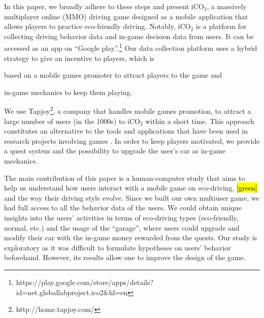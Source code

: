 \documentclass[preprint,authoryear,12pt]{elsarticle}
\newcommand{\hlc}[2][yellow]{ {\sethlcolor{#1} \hl{#2}} }
\begin{document}
In this paper, we broadly adhere to these steps and present iCO$_2$, a massively multiplayer online (MMO) driving game designed as a mobile application that allows players to practice eco-friendly driving. Notably, iCO$_2$ is a platform for collecting driving behavior data and in-game decision data from users. It can be accessed as an app on ``Google play''.\footnote{https://play.google.com/store/apps/details?id=net.globallabproject.ico2\&hl=en}
Our data collection platform uses a hybrid strategy to give an incentive to players, which is \begin{inparaenum} \item based on a mobile games promoter to attract players to the game and \item in-game mechanics to keep them playing. \end{inparaenum} We use Tapjoy\footnote{http://home.tapjoy.com/}, %
a company that handles mobile games promotion, to attract a large number of users (in the 1000s) to iCO$_2$ within a short time. This approach constitutes an alternative to the tools and applications that have been used in research projects involving games \citep{kittur2008crowdsourcing,Biewald:2012,ChanH12}.
In order to keep players motivated, we provide a quest system and the possibility to upgrade the user's car as in-game mechanics.

The main contribution of this paper is a human-computer study that aims to help us understand how users interact with a mobile game on eco-driving, 
\hlc{[green]}{and the way their driving style evolve.} 
Since we built our own multiuser game, we had full access to all the behavior data of the users. We could obtain unique insights into the users' activities in terms of eco-driving types (eco-friendly, normal, etc.) and the usage of the ``garage'', where users could upgrade and modify their car with the in-game money rewarded from the quests. Our study is exploratory as it was difficult to formulate hypotheses on users' behavior beforehand. However, its results allow one to improve the design of the game.

\end{document}
